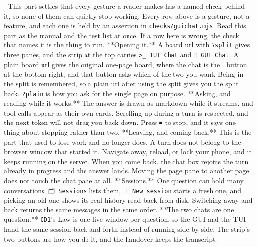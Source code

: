 📌 This part settles that every gesture a reader makes has a named check behind it, so none of them can quietly stop working. Every row above is a gesture, not a feature, and each one is held by an assertion in \texttt{checks/guichat.mjs}. Read this part as the manual and the test list at once. If a row here is wrong, the check that names it is the thing to run. **Opening it.** A board url with \texttt{?split} gives three panes, and the strip at the top carries \texttt{>\_ TUI Chat} and \texttt{💬 GUI Chat}. A plain board url gives the original one-page board, where the chat is the 💬 button at the bottom right, and that button asks which of the two you want. Being in the split is remembered, so a plain url after using the split gives you the split back. \texttt{?plain} is how you ask for the single page on purpose. **Asking, and reading while it works.** The answer is drawn as markdown while it streams, and tool calls appear as their own cards. Scrolling up during a turn is respected, and the next token will not drag you back down. Press ⏹ to stop, and it says one thing about stopping rather than two. **Leaving, and coming back.** This is the part that used to lose work and no longer does. A turn does not belong to the browser window that started it. Navigate away, reload, or lock your phone, and it keeps running on the server. When you come back, the chat box rejoins the turn already in progress and the answer lands. Moving the page pane to another page does not touch the chat pane at all. **Sessions.** One question can hold many conversations. \texttt{🗂 Sessions} lists them, \texttt{＋ New session} starts a fresh one, and picking an old one shows its real history read back from disk. Switching away and back returns the same messages in the same order. **The two chats are one question.** \texttt{QD1}'s Law is one live window per question, so the GUI and the TUI hand the same session back and forth instead of running side by side. The strip's two buttons are how you do it, and the handover keeps the transcript.

